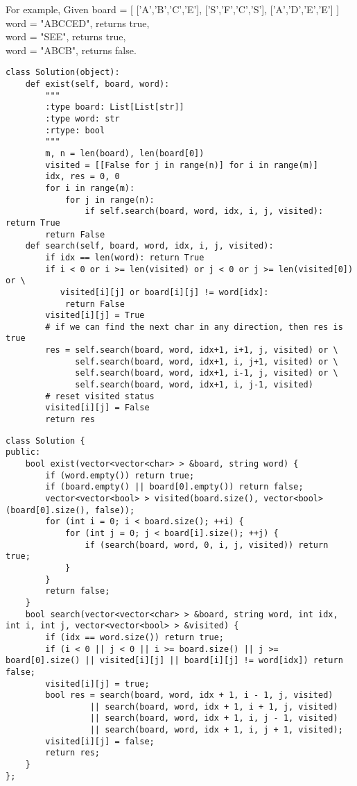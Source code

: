 For example,
Given board =
[
  ['A','B','C','E'],
  ['S','F','C','S'],
  ['A','D','E','E']
]\\

word = "ABCCED", returns true,\\
word = "SEE", returns true,\\
word = "ABCB", returns false.\\

\begin{lstlisting}
class Solution(object):
    def exist(self, board, word):
        """
        :type board: List[List[str]]
        :type word: str
        :rtype: bool
        """
        m, n = len(board), len(board[0])
        visited = [[False for j in range(n)] for i in range(m)]
        idx, res = 0, 0
        for i in range(m):
            for j in range(n):
                if self.search(board, word, idx, i, j, visited): return True
        return False
    def search(self, board, word, idx, i, j, visited):
        if idx == len(word): return True
        if i < 0 or i >= len(visited) or j < 0 or j >= len(visited[0]) or \
           visited[i][j] or board[i][j] != word[idx]:
            return False
        visited[i][j] = True
        # if we can find the next char in any direction, then res is true
        res = self.search(board, word, idx+1, i+1, j, visited) or \
              self.search(board, word, idx+1, i, j+1, visited) or \
              self.search(board, word, idx+1, i-1, j, visited) or \
              self.search(board, word, idx+1, i, j-1, visited)
        # reset visited status
        visited[i][j] = False
        return res
\end{lstlisting}

\begin{lstlisting}
class Solution {
public:
    bool exist(vector<vector<char> > &board, string word) {
        if (word.empty()) return true;
        if (board.empty() || board[0].empty()) return false;
        vector<vector<bool> > visited(board.size(), vector<bool>(board[0].size(), false));
        for (int i = 0; i < board.size(); ++i) {
            for (int j = 0; j < board[i].size(); ++j) {
                if (search(board, word, 0, i, j, visited)) return true;
            }
        }
        return false;
    }
    bool search(vector<vector<char> > &board, string word, int idx, int i, int j, vector<vector<bool> > &visited) {
        if (idx == word.size()) return true;
        if (i < 0 || j < 0 || i >= board.size() || j >= board[0].size() || visited[i][j] || board[i][j] != word[idx]) return false;
        visited[i][j] = true;
        bool res = search(board, word, idx + 1, i - 1, j, visited) 
                 || search(board, word, idx + 1, i + 1, j, visited)
                 || search(board, word, idx + 1, i, j - 1, visited)
                 || search(board, word, idx + 1, i, j + 1, visited);
        visited[i][j] = false;
        return res;
    }
};
\end{lstlisting}

